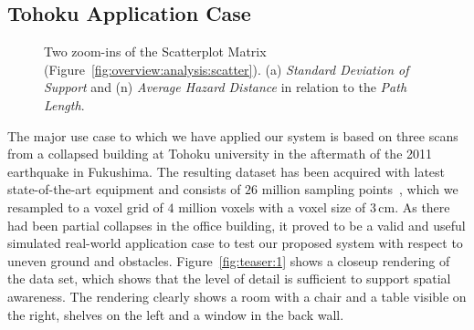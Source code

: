 \documentclass[review,journal]{vgtc}         %
\begin{document}
\subsection{Tohoku Application Case} \label{sec:results:applicationcase}
\begin{figure}[b]
    \vspace{-0.5cm}
    \centering
    \hspace{0.5cm}
    \caption{Two zoom-ins of the Scatterplot Matrix (Figure~\ref{fig:overview:analysis:scatter}).  (a) \emph{Standard Deviation of Support} and (n) \emph{Average Hazard Distance} in relation to the \emph{Path Length}.}
\end{figure}


The major use case to which we have applied our system is based on three scans from a collapsed building at Tohoku university in the aftermath of the 2011 earthquake in Fukushima. The resulting dataset has been acquired with latest state-of-the-art equipment and consists of $26$ million sampling points~\cite{journals/jfr/NagataniKOOYTNYKFK13}, which we resampled to a voxel grid of $4$ million voxels with a voxel size of 3\,cm. As there had been partial collapses in the office building, it proved to be a valid and useful simulated real-world application case to test our proposed system with respect to uneven ground and obstacles. Figure~\ref{fig:teaser:1} shows a closeup rendering of the data set, which shows that the level of detail is sufficient to support spatial awareness. The rendering clearly shows a room with a chair and a table visible on the right, shelves on the left and a window in the back wall.
\end{document}
